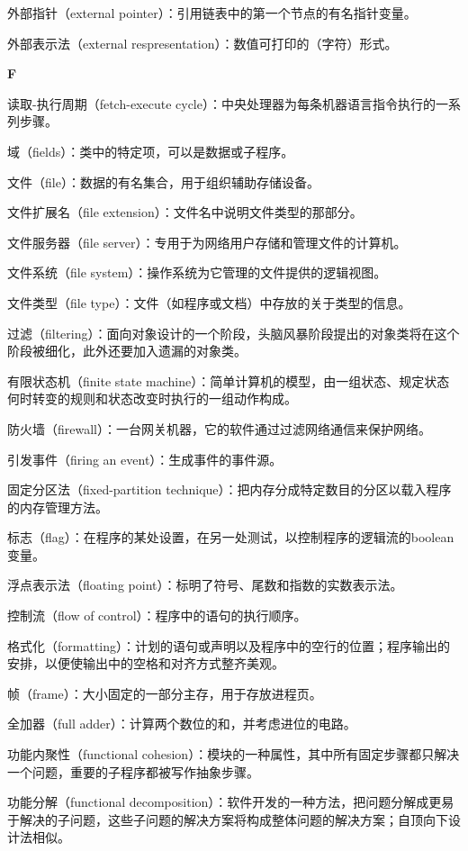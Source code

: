 外部指针（external pointer）：引用链表中的第一个节点的有名指针变量。

外部表示法（external respresentation）：数值可打印的（字符）形式。

\textbf{F}

读取-执行周期（fetch-execute cycle）：中央处理器为每条机器语言指令执行的一系列步骤。

域（fields）：类中的特定项，可以是数据或子程序。

文件（file）：数据的有名集合，用于组织辅助存储设备。

文件扩展名（file extension）：文件名中说明文件类型的那部分。

文件服务器（file server）：专用于为网络用户存储和管理文件的计算机。

文件系统（file system）：操作系统为它管理的文件提供的逻辑视图。

文件类型（file type）：文件（如程序或文档）中存放的关于类型的信息。

过滤（filtering）：面向对象设计的一个阶段，头脑风暴阶段提出的对象类将在这个阶段被细化，此外还要加入遗漏的对象类。

有限状态机（finite state machine）：简单计算机的模型，由一组状态、规定状态何时转变的规则和状态改变时执行的一组动作构成。

防火墙（firewall）：一台网关机器，它的软件通过过滤网络通信来保护网络。

引发事件（firing an event）：生成事件的事件源。

固定分区法（fixed-partition technique）：把内存分成特定数目的分区以载入程序的内存管理方法。

标志（flag）：在程序的某处设置，在另一处测试，以控制程序的逻辑流的boolean变量。

浮点表示法（floating point）：标明了符号、尾数和指数的实数表示法。

控制流（flow of control）：程序中的语句的执行顺序。

格式化（formatting）：计划的语句或声明以及程序中的空行的位置；程序输出的安排，以便使输出中的空格和对齐方式整齐美观。

帧（frame）：大小固定的一部分主存，用于存放进程页。

全加器（full adder）：计算两个数位的和，并考虑进位的电路。

功能内聚性（functional cohesion）：模块的一种属性，其中所有固定步骤都只解决一个问题，重要的子程序都被写作抽象步骤。

功能分解（functional decomposition）：软件开发的一种方法，把问题分解成更易于解决的子问题，这些子问题的解决方案将构成整体问题的解决方案；自顶向下设计法相似。

